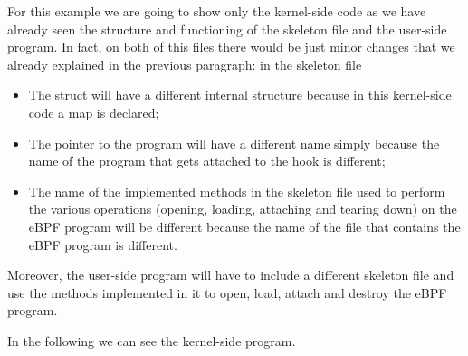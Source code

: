 For this example we are going to show only the kernel-side code as we have already seen the structure and functioning of the skeleton file and the user-side program.
In fact, on both of this files there would be just minor changes that we already explained in the previous paragraph: in the skeleton file 

\begin{itemize}
	\item The struct will have a different internal structure because in this
		kernel-side code a map is declared;
	\item The pointer to the program will have a different name simply because the 
		name of the program that gets attached to the hook is different; 
	\item The name of the implemented methods in the skeleton file used to perform the
		various operations (opening, loading, attaching and tearing down) on the eBPF program will be different because the name of the file that contains the eBPF program is different.
\end{itemize}

Moreover, the user-side program will have to include a different skeleton file and use the methods implemented in it to open, load, attach and destroy the eBPF program.

In the following we can see the kernel-side program.

